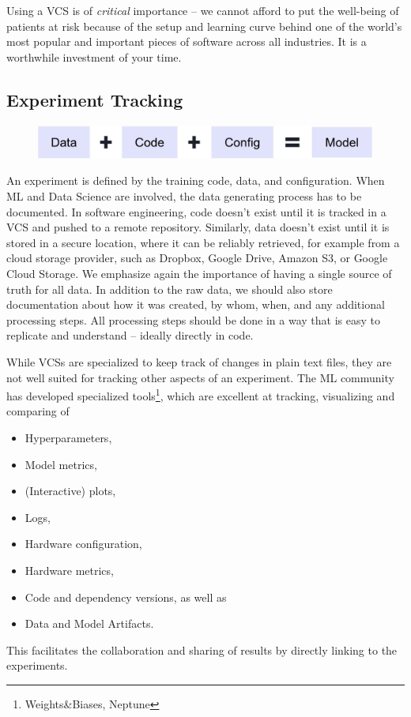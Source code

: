 Using a VCS is of \textit{critical} importance -- we cannot afford to put the well-being of patients at risk because of the setup and learning curve behind one of the world's most popular and important pieces of software across all industries. It is a worthwhile investment of your time.

\subsection{Experiment Tracking}
\label{sec:experiment_tracking}
\begin{figure}[h]
    \includegraphics[width=\linewidth]{chapters/NLP/figures/model.png}
    \label{fig:model}
\end{figure}
An experiment is defined by the training code, data, and configuration.
When ML and Data Science are involved, the data generating process has to be documented.
In software engineering, code doesn't exist until it is tracked in a VCS and pushed to a remote repository.
Similarly, data doesn't exist until it is stored in a secure location, where it can be reliably retrieved, for example from a cloud storage provider, such as Dropbox, Google Drive, Amazon S3, or Google Cloud Storage.
We emphasize again the importance of having a single source of truth for all data.
In addition to the raw data, we should also store documentation about how it was created, by whom, when, and any additional processing steps.
All processing steps should be done in a way that is easy to replicate and understand -- ideally directly in code.

While VCSs are specialized to keep track of changes in plain text files, they are not well suited for tracking other aspects of an experiment.
The ML community has developed specialized tools\footnote{Weights\&Biases, Neptune}, which are excellent at tracking, visualizing and comparing of
\begin{itemize}
    \item Hyperparameters,
    \item Model metrics,
    \item (Interactive) plots,
    \item Logs,
    \item Hardware configuration,
    \item Hardware metrics,
    \item Code and dependency versions, as well as
    \item Data and Model Artifacts.
\end{itemize}
This facilitates the collaboration and sharing of results by directly linking to the experiments.

